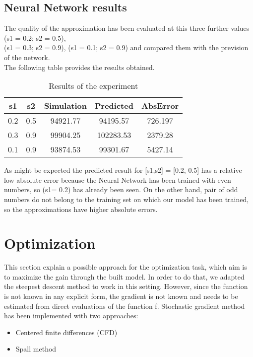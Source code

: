 \documentclass{article}
\begin{document}
    
    
    













\subsection{Neural Network results}
The quality
of the approximation has been evaluated at this three further
values (s1 = 0.2; s2 = 0.5), \\(s1 = 0.3; s2 = 0.9), (s1 = 0.1; s2 = 0.9) and
compared them with the prevision of the network. \\
The following table provides the results obtained.
\begin{table}[h!]
\centering
 \begin{tabular}{|c c c c c|} 
 \hline
 s1 & s2 & Simulation & Predicted & AbsError \\ [0.5ex] 
 \hline\hline
 0.2 & 0.5 & 94921.77 & 94195.57 & 726.197 \\ 
 0.3 & 0.9 & 99904.25  & 102283.53 & 2379.28 \\
 0.1 & 0.9 & 93874.53 & 99301.67 & 5427.14 \\ [1ex] 
 \hline
 \end{tabular}
 \caption{Results of the experiment}
\label{table:1}
\end{table}

As might be expected the predicted result for [s1,s2] = [0.2, 0.5] has a relative low absolute error because the Neural Network has been trained with even numbers, so  (s1= 0.2) has already been seen. On the other hand, pair of odd numbers do not belong to the training set on which our model has been trained, so the approximations have higher absolute errors.

















\section{Optimization}
This section explain a possible approach for the optimization task, which aim is to maximize the gain through the built model. In order to do that, we adapted the steepest descent method to work in this setting.
However, since the function is not known in any explicit form, the gradient is
not known and needs to be estimated from direct evaluations of the function f. Stochastic gradient method has been implemented with two approaches:\begin{itemize}
    \item Centered finite differences (CFD)
    \item Spall method
\end{itemize}
\end{document}
